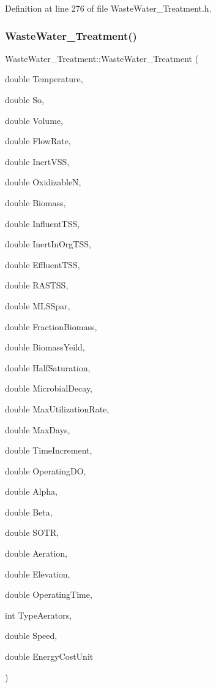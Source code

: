 Definition at line 276 of file Waste\+Water\+\_\+\+Treatment.\+h.

\mbox{\label{class_waste_water___treatment_aec57a97589b18d14aecd786271b8b5be}} 
\subsubsection{\texorpdfstring{Waste\+Water\+\_\+\+Treatment()}{WasteWater\_Treatment()}\hspace{0.1cm}{\footnotesize\ttfamily [2/3]}}
{\footnotesize\ttfamily Waste\+Water\+\_\+\+Treatment\+::\+Waste\+Water\+\_\+\+Treatment (\begin{DoxyParamCaption}\item[{double}]{Temperature,  }\item[{double}]{So,  }\item[{double}]{Volume,  }\item[{double}]{Flow\+Rate,  }\item[{double}]{Inert\+V\+SS,  }\item[{double}]{OxidizableN,  }\item[{double}]{Biomass,  }\item[{double}]{Influent\+T\+SS,  }\item[{double}]{Inert\+In\+Org\+T\+SS,  }\item[{double}]{Effluent\+T\+SS,  }\item[{double}]{R\+A\+S\+T\+SS,  }\item[{double}]{M\+L\+S\+Spar,  }\item[{double}]{Fraction\+Biomass,  }\item[{double}]{Biomass\+Yeild,  }\item[{double}]{Half\+Saturation,  }\item[{double}]{Microbial\+Decay,  }\item[{double}]{Max\+Utilization\+Rate,  }\item[{double}]{Max\+Days,  }\item[{double}]{Time\+Increment,  }\item[{double}]{Operating\+DO,  }\item[{double}]{Alpha,  }\item[{double}]{Beta,  }\item[{double}]{S\+O\+TR,  }\item[{double}]{Aeration,  }\item[{double}]{Elevation,  }\item[{double}]{Operating\+Time,  }\item[{int}]{Type\+Aerators,  }\item[{double}]{Speed,  }\item[{double}]{Energy\+Cost\+Unit }\end{DoxyParamCaption})\hspace{0.3cm}{\ttfamily [inline]}}


